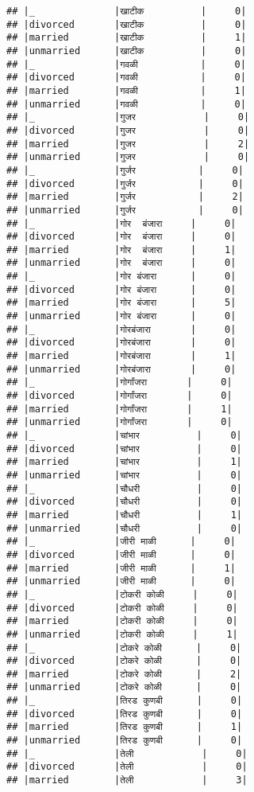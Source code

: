 \documentclass[
]{article}
\begin{document}
\begin{verbatim}
## |_              |खाटीक          |     0|
## |divorced       |खाटीक          |     0|
## |married        |खाटीक          |     1|
## |unmarried      |खाटीक          |     0|
## |_              |गवळी           |     0|
## |divorced       |गवळी           |     0|
## |married        |गवळी           |     1|
## |unmarried      |गवळी           |     0|
## |_              |गुजर            |     0|
## |divorced       |गुजर            |     0|
## |married        |गुजर            |     2|
## |unmarried      |गुजर            |     0|
## |_              |गुर्जर           |     0|
## |divorced       |गुर्जर           |     0|
## |married        |गुर्जर           |     2|
## |unmarried      |गुर्जर           |     0|
## |_              |गोर  बंजारा     |     0|
## |divorced       |गोर  बंजारा     |     0|
## |married        |गोर  बंजारा     |     1|
## |unmarried      |गोर  बंजारा     |     0|
## |_              |गोर बंजारा      |     0|
## |divorced       |गोर बंजारा      |     0|
## |married        |गोर बंजारा      |     5|
## |unmarried      |गोर बंजारा      |     0|
## |_              |गोरबंजारा       |     0|
## |divorced       |गोरबंजारा       |     0|
## |married        |गोरबंजारा       |     1|
## |unmarried      |गोरबंजारा       |     0|
## |_              |गोर्गांजरा       |     0|
## |divorced       |गोर्गांजरा       |     0|
## |married        |गोर्गांजरा       |     1|
## |unmarried      |गोर्गांजरा       |     0|
## |_              |चांभार          |     0|
## |divorced       |चांभार          |     0|
## |married        |चांभार          |     1|
## |unmarried      |चांभार          |     0|
## |_              |चौधरी          |     0|
## |divorced       |चौधरी          |     0|
## |married        |चौधरी          |     1|
## |unmarried      |चौधरी          |     0|
## |_              |जीरी माळी      |     0|
## |divorced       |जीरी माळी      |     0|
## |married        |जीरी माळी      |     1|
## |unmarried      |जीरी माळी      |     0|
## |_              |टोकरी कोळी     |     0|
## |divorced       |टोकरी कोळी     |     0|
## |married        |टोकरी कोळी     |     0|
## |unmarried      |टोकरी कोळी     |     1|
## |_              |टोकरे कोळी      |     0|
## |divorced       |टोकरे कोळी      |     0|
## |married        |टोकरे कोळी      |     2|
## |unmarried      |टोकरे कोळी      |     0|
## |_              |तिरड कुणबी      |     0|
## |divorced       |तिरड कुणबी      |     0|
## |married        |तिरड कुणबी      |     1|
## |unmarried      |तिरड कुणबी      |     0|
## |_              |तेली            |     0|
## |divorced       |तेली            |     0|
## |married        |तेली            |     3|

\end{verbatim}
\end{document}
